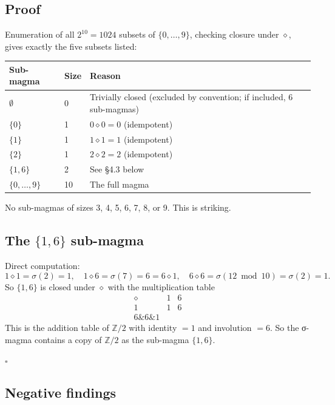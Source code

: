 \documentclass[11pt,reqno]{amsart}
\theoremstyle{plain}
\theoremstyle{definition}
\begin{document}
\subsection{Proof}

Enumeration of all $2^{10} = 1024$ subsets of $\{0, \ldots, 9\}$, checking closure under $\diamond$, gives exactly the five subsets listed:

\begin{center}
\begin{tabular}{lll}
\toprule
Sub-magma & Size & Reason \\
\midrule
$\emptyset$ & 0 & Trivially closed (excluded by convention; if included, 6 sub-magmas) \\
$\{0\}$ & 1 & $0 \diamond 0 = 0$ (idempotent) \\
$\{1\}$ & 1 & $1 \diamond 1 = 1$ (idempotent) \\
$\{2\}$ & 1 & $2 \diamond 2 = 2$ (idempotent) \\
$\{1, 6\}$ & 2 & See §4.3 below \\
$\{0, \ldots, 9\}$ & 10 & The full magma \\
\bottomrule
\end{tabular}
\end{center}

No sub-magmas of sizes 3, 4, 5, 6, 7, 8, or 9. This is striking.

\subsection{The $\{1, 6\}$ sub-magma}

Direct computation:
$$
1 \diamond 1 = \sigma(2) = 1, \quad
1 \diamond 6 = \sigma(7) = 6 = 6 \diamond 1, \quad
6 \diamond 6 = \sigma(12 \bmod 10) = \sigma(2) = 1.
$$
So $\{1, 6\}$ is closed under $\diamond$ with the multiplication table
$$
\begin{array}{c|cc}
\diamond & 1 & 6 \\
\hline
1 & 1 & 6 \\
6 \& 6 \& 1
\end{array}
$$
This is the addition table of $\mathbb{Z}/2$ with identity $= 1$ and involution $= 6$. So the σ-magma contains a copy of $\mathbb{Z}/2$ as the sub-magma $\{1, 6\}$.

$\square$

\subsection{Negative findings}
\end{document}
